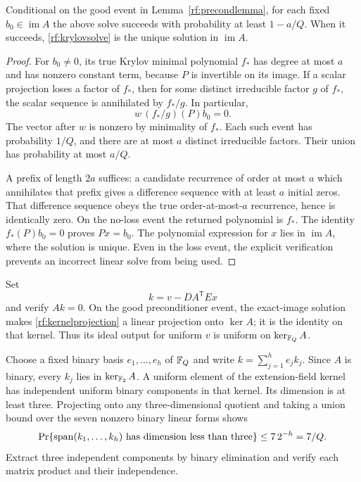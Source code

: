 \begin{lemma}
\label{rf:krylovlemma}
Conditional on the good event in Lemma~\ref{rf:precondlemma},
for each fixed $b_0\in\operatorname{im}A$ the above solve succeeds
with probability at least $1-a/Q$.  When it succeeds,
\eqref{rf:krylovsolve} is the unique solution in
$\operatorname{im}A$.
\end{lemma}
\begin{proof}
For $b_0\ne0$, its true Krylov minimal polynomial $f_*$ has degree
at most $a$ and has nonzero constant term, because $P$ is
invertible on its image.  If a scalar projection loses a factor
of $f_*$, then for some distinct irreducible factor $g$ of $f_*$,
the scalar sequence is annihilated by $f_*/g$.  In particular,
\[
 w\,(f_*/g)(P)b_0=0.
\]
The vector after $w$ is nonzero by minimality of $f_*$.
Each such event has probability $1/Q$, and there are at most $a$
distinct irreducible factors.  Their union has probability at
most $a/Q$.

A prefix of length $2a$ suffices: a candidate recurrence of order
at most $a$ which annihilates that prefix gives a difference
sequence with at least $a$ initial zeros.  That difference
sequence obeys the true order-at-most-$a$ recurrence, hence is
identically zero.  On the no-loss event the returned polynomial
is $f_*$.  The identity $f_*(P)b_0=0$ proves
$Px=b_0$.  The polynomial expression for $x$ lies in
$\operatorname{im}A$, where the solution is unique.  Even in the
loss event, the explicit verification prevents an incorrect
linear solve from being used.
\end{proof}

Set
\begin{equation}
 k=v-DA^{\mathsf T}Ex
 \label{rf:kernelprojection}
\end{equation}
and verify $Ak=0$.
On the good preconditioner event, the exact-image solution makes
\eqref{rf:kernelprojection} a linear projection onto $\ker A$;
it is the identity on that kernel.  Thus its ideal output for
uniform $v$ is uniform on $\ker_{
 \mathbb F_Q}A$.

Choose a fixed binary basis $e_1,\ldots,e_h$ of $\mathbb F_Q$ and
write $k=\sum_{j=1}^h e_jk_j$.
Since $A$ is binary, every $k_j$ lies in
$\ker_{
 \mathbb F_2}A$.  A uniform element of the extension-field kernel has
independent uniform binary components in that kernel.  Its
dimension is at least three.  Projecting onto any three-dimensional
quotient and taking a union bound over the seven nonzero binary
linear forms shows
\[
 \mathop{\rm Pr}\{\operatorname{span}(k_1,\ldots,k_h)
                  \text{ has dimension less than three}\}
 \le7\,2^{-h}=7/Q.
\]
Extract three independent components by binary elimination and
verify each matrix product and their independence.

